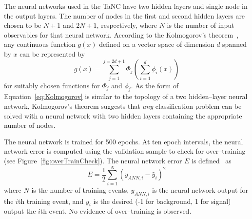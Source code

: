 The neural networks used in the TaNC have two hidden layers and single node in
the output layers.  The number of nodes in the first and second hidden layers
are chosen to be $N+1$ and $2N+1$, respectively, where $N$ is the number of
input observables for that neural network.  According to the Kolmogorov's
theorem~\cite{Kolmogorov}, any continuous function $g(x)$ defined on a vector
space of dimension $d$ spanned by $x$ can be represented by
\begin{equation}
   g(x) = \sum_{j=1}^{j=2d+1} \Phi_j \left(\sum_{i=1}^{d} \phi_i(x) \right)
   \label{eq:Kolmogorov}
\end{equation}
for suitably chosen functions for $\Phi_j$ and $\phi_j$.  As the form of
Equation~\ref{eq:Kolmogorov} is similar to the topology of a two hidden--layer
neural network, Kolmogorov's theorem suggests that \emph{any} classification
problem can be solved with a neural network with two hidden layers containing
the appropriate number of nodes.

The neural network is trained for 500 epochs. At ten epoch intervals, the
neural network error is computed using the validation sample to check for
over--training (see Figure~\ref{fig:overTrainCheck}). The neural network error
$E$ is defined~\cite{TMVA} as
\begin{equation}
   E = \frac{1}{2} \sum_{i=1}^N (y_{ANN,i} - \hat y_i)^2
   \label{eq:NNerrorFunc}
\end{equation}
where $N$ is the number of training events, $y_{ANN,i}$ is the neural network output
for the $i$th training event, and $y_i$ is the desired (-1 for background, 1 for signal) output
the $i$th event. No evidence  of over--training is observed.

